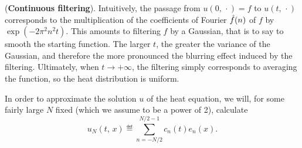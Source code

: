 \begin{rem}{(\upshape \textbf{Continuous filtering}).} 
  Intuitively, the passage from $ u (0, \, \cdot) = f $ to $ u (t, \, \cdot) $ corresponds to the multiplication of the coefficients of Fourier $ \hat{f} (n) $ of $ f $ by $ \exp (-2 \pi^2n^2 t) $. This amounts to filtering $ f $ by a Gaussian, that is to say to smooth the starting function. The larger $ t $, the greater the variance of the Gaussian, and therefore the more pronounced the blurring effect induced by the filtering. Ultimately, when $ t \rightarrow + \infty $, the filtering simply corresponds to averaging the function, so the heat distribution is uniform.
\end{rem}
 
 
 
In order to approximate the solution $ u $ of the heat equation, we will, for some fairly large $ N $ fixed (which we assume to be a power of 2), calculate
\begin{equation*}
u_N (t, \, x) \eqdef \sum_{n = -N / 2}^{N / 2-1}{c_n (t) e_n (x)}.
\end{equation*}
